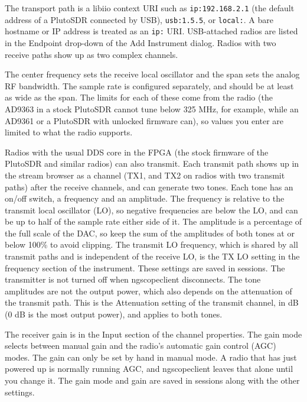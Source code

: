 The transport path is a libiio context URI such as \texttt{ip:192.168.2.1} (the default address of a PlutoSDR
connected by USB), \texttt{usb:1.5.5}, or \texttt{local:}. A bare hostname or IP address is treated as an \texttt{ip:}
URI. USB-attached radios are listed in the Endpoint drop-down of the Add Instrument dialog. Radios with two receive
paths show up as two complex channels.

The center frequency sets the receive local oscillator and the span sets the analog RF bandwidth. The sample rate is
configured separately, and should be at least as wide as the span. The limits for each of these come from the radio
(the AD9363 in a stock PlutoSDR cannot tune below 325 MHz, for example, while an AD9361 or a PlutoSDR with unlocked
firmware can), so values you enter are limited to what the radio supports.

Radios with the usual DDS core in the FPGA (the stock firmware of the PlutoSDR and similar radios) can also transmit.
Each transmit path shows up in the stream browser as a channel (TX1, and TX2 on radios with two transmit paths) after
the receive channels, and can generate two tones. Each tone has an on/off switch, a frequency and an amplitude. The
frequency is relative to the transmit local oscillator (LO), so negative frequencies are below the LO, and can be up to
half of the sample rate either side of it. The amplitude is a percentage of the full scale of the DAC, so keep the sum
of the amplitudes of both tones at or below 100\% to avoid clipping. The transmit LO frequency, which is shared by all
transmit paths and is independent of the receive LO, is the TX LO setting in the frequency section of the instrument.
These settings are saved in sessions. The transmitter is not turned off when ngscopeclient disconnects.
The tone amplitudes are not the output power, which also depends on the attenuation of the transmit path. This is the
Attenuation setting of the transmit channel, in dB (0 dB is the most output power), and applies to both tones.

The receiver gain is in the Input section of the channel properties. The gain mode selects between manual gain and
the radio's automatic gain control (AGC) modes. The gain can only be set by hand in manual mode. A radio that has just
powered up is normally running AGC, and ngscopeclient leaves that alone until you change it. The gain mode and gain
are saved in sessions along with the other settings.

